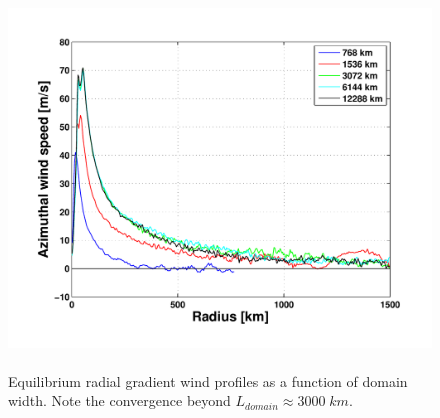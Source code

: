 \documentclass[12pt]{article}
\begin{document}

{}
{\clearpage}



\begin{figure}[h!]
\centering
  \noindent\includegraphics[width=15cm,height=10cm]{FIGURES_TC_RCE_equilibrium_v2.0/Fig1_Domain_size.pdf}
\caption{Equilibrium radial gradient wind profiles as a function of domain width.  Note the convergence beyond $L_{domain} \approx 3000 \; km$.}
\label{fig:domainsize}
\end{figure}
\end{document}
